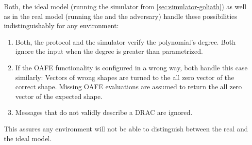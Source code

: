 Both, the ideal model (running the simulator from \ref{sec:simulator-goliath})
as well as in the real model (running the \JWprotoSymOPE{} and the adversary)
handle these possibilities indistinguishably for any environment:

\begin{enumerate}

  \item Both, the protocol and the simulator verify the polynomial's degree.
    Both ignore the input when the degree is greater than parametrized.

  \item If the OAFE functionality is configured in a wrong way, both handle this
    case similarly: Vectors of wrong shapes are turned to the all zero vector of
    the correct shape. Missing OAFE evaluations are assumed to return the all
    zero vector of the expected shape.

  \item Messages that do not validly describe a DRAC are ignored.

\end{enumerate}

This assures any environment will not be able to distinguish between the real
and the ideal model.

